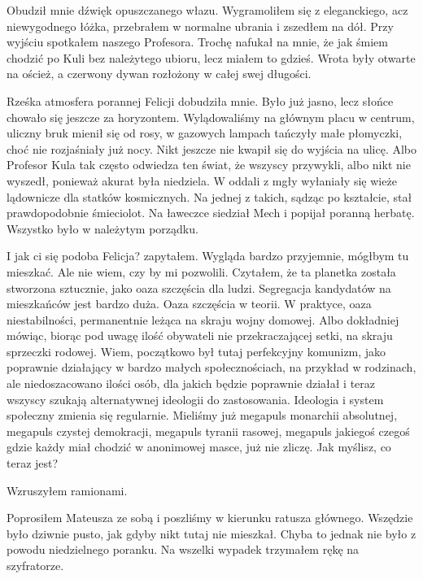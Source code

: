 Obudził mnie dźwięk opuszczanego włazu.
Wygramoliłem się z eleganckiego, acz niewygodnego łóżka, przebrałem w normalne ubrania i zszedłem na dół.
Przy wyjściu spotkałem naszego Profesora.
Trochę nafukał na mnie, że jak śmiem chodzić po Kuli bez należytego ubioru, lecz miałem to gdzieś.
Wrota były otwarte na oścież, a czerwony dywan rozłożony w całej swej długości.

Rześka atmosfera porannej Felicji dobudziła mnie. Było już jasno, lecz słońce chowało się jeszcze za horyzontem.
Wylądowaliśmy na głównym placu w centrum, uliczny bruk mienił się od rosy, w gazowych lampach tańczyły małe płomyczki, choć nie rozjaśniały już nocy.
Nikt jeszcze nie kwapił się do wyjścia na ulicę. Albo Profesor Kula tak często odwiedza ten świat, że wszyscy przywykli, albo nikt nie wyszedł, ponieważ akurat była niedziela.
W oddali z mgły wyłaniały się wieże lądownicze dla statków kosmicznych. Na jednej z takich, sądząc po kształcie, stał prawdopodobnie śmieciolot.
Na ławeczce siedział Mech i popijał poranną herbatę.
Wszystko było w należytym porządku.
\begin{dialogue}
\ds{} I jak ci się podoba Felicja? \dm{} zapytałem.
\ds{} Wygląda bardzo przyjemnie, mógłbym tu mieszkać. Ale nie wiem, czy by mi pozwolili. Czytałem, że ta planetka została stworzona sztucznie, jako oaza szczęścia dla ludzi. 
Segregacja kandydatów na mieszkańców jest bardzo duża.
\ds{} Oaza szczęścia w teorii. W praktyce, oaza niestabilności, permanentnie leżąca na skraju wojny domowej. 
Albo dokładniej mówiąc, biorąc pod uwagę ilość obywateli nie przekraczającej setki, na skraju sprzeczki rodowej.
\ds{} Wiem, początkowo był tutaj perfekcyjny komunizm, jako poprawnie działający w bardzo małych społecznościach, na przykład w rodzinach, 
ale niedoszacowano ilości osób, dla jakich będzie poprawnie działał i teraz wszyscy szukają alternatywnej ideologii do zastosowania.
\ds{} Ideologia i system społeczny zmienia się regularnie. 
Mieliśmy już megapuls monarchii absolutnej, megapuls czystej demokracji, megapuls tyranii rasowej, megapuls jakiegoś czegoś gdzie każdy miał chodzić w anonimowej masce, już nie zliczę.
\ds{} Jak myślisz, co teraz jest?
\end{dialogue}
Wzruszyłem ramionami.

Poprosiłem Mateusza ze sobą i poszliśmy w kierunku ratusza głównego.
Wszędzie było dziwnie pusto, jak gdyby nikt tutaj nie mieszkał. 
Chyba to jednak nie było z powodu niedzielnego poranku.
Na wszelki wypadek trzymałem rękę na szyfratorze.

